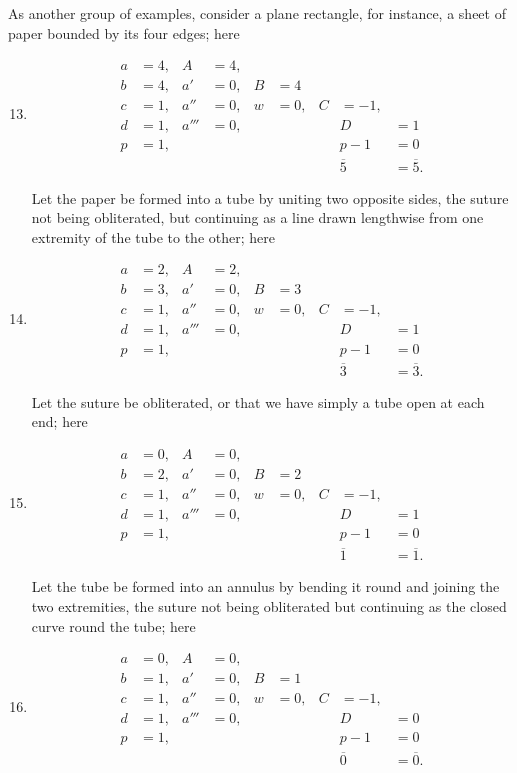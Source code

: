 \documentclass[11pt,a4paper]{article}
\theoremstyle{plain}
\theoremstyle{definition}
\begin{document}
\clearpage

As another group of examples, consider a plane rectangle, for instance, a sheet of
paper bounded by its four edges; here

\begin{enumerate}
\setcounter{enumi}{12}
\item
\begin{align*}
a &= 4, & A &= 4, \\
b &= 4, & a' &= 0, & B &= 4 \\
c &= 1, & a'' &= 0, & w &= 0, & C &= -1, \\
d &= 1, & a''' &= 0, & & & & D &= 1 \\
p &= 1, & & & & & & p - 1 &= 0 \\[2pt]
& & & & & & & \overline{5} &= \overline{5}.
\end{align*}

Let the paper be formed into a tube by uniting two opposite sides, the suture not
being obliterated, but continuing as a line drawn lengthwise from one extremity of
the tube to the other; here

\item
\begin{align*}
a &= 2, & A &= 2, \\
b &= 3, & a' &= 0, & B &= 3 \\
c &= 1, & a'' &= 0, & w &= 0, & C &= -1, \\
d &= 1, & a''' &= 0, & & & & D &= 1 \\
p &= 1, & & & & & & p - 1 &= 0 \\[2pt]
& & & & & & & \overline{3} &= \overline{3}.
\end{align*}

Let the suture be obliterated, or that we have simply a tube open at each end;
here

\item
\begin{align*}
a &= 0, & A &= 0, \\
b &= 2, & a' &= 0, & B &= 2 \\
c &= 1, & a'' &= 0, & w &= 0, & C &= -1, \\
d &= 1, & a''' &= 0, & & & & D &= 1 \\
p &= 1, & & & & & & p - 1 &= 0 \\[2pt]
& & & & & & & \overline{1} &= \overline{1}.
\end{align*}

Let the tube be formed into an annulus by bending it round and joining the
two extremities, the suture not being obliterated but continuing as the closed curve
round the tube; here

\item
\begin{align*}
a &= 0, & A &= 0, \\
b &= 1, & a' &= 0, & B &= 1 \\
c &= 1, & a'' &= 0, & w &= 0, & C &= -1, \\
d &= 1, & a''' &= 0, & & & & D &= 0 \\
p &= 1, & & & & & & p - 1 &= 0 \\[2pt]
& & & & & & & \overline{0} &= \overline{0}.
\end{align*}
\end{enumerate}
\end{document}
